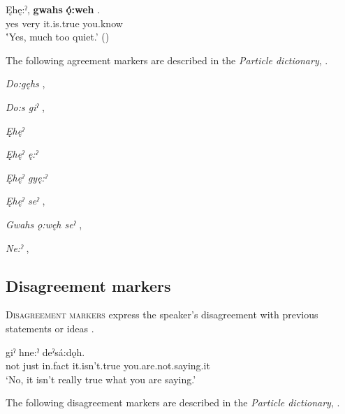  \gll Ęhę:ˀ, \textbf{gwahs} \textbf{ǫ́:weh} .\\
yes very it.is.true you.know\\
\glt ‛Yes, much too quiet.’ (\cite{carrier_legends_2013})
\z

The following agreement markers are described in the \textit{Particle dictionary}, .

\begin{CayugaRelated}
\item{}\textit{Do:gęhs} , \\
\item{}\textit{Do:s giˀ} , \\
\item{}\textit{Ęhęˀ} \\
\item{}\textit{Ęhęˀ ę:ˀ} \\
\item{}\textit{Ęhęˀ gyę:ˀ} \\
\item{}\textit{Ęhęˀ seˀ} , \\
\item{}\textit{Gwahs ǫ:węh seˀ} , \\
\item{}\textit{Ne:ˀ} , \\
\end{CayugaRelated}


\subsection{Disagreement markers} \label{ch:Disagreement markers}
\textsc{Disagreement markers} express the speaker’s disagreement with previous statements or ideas . 


\ea\label{ex:disagreement}
 \gll {} giˀ hne:ˀ  deˀsá:dǫh. \\
not just in.fact it.isn’t.true you.are.not.saying.it\\
\glt ‘No, it isn’t really true what you are saying.’
\z

The following disagreement markers are described in the \textit{Particle dictionary}, .

